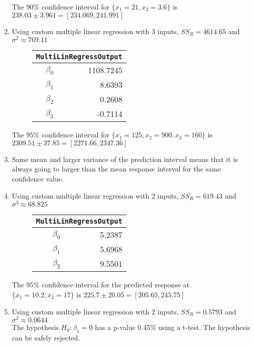 \begin{enumerate}
The $ 90\% $ confidence interval for $ \{x_1 = 21, x_2 = 3.6\} $ is
$ 238.03 \pm 3.961 = [234.069, 241.991]$

\item Using custom multiple linear regression with 3 inputs,
$ SS_R = 4614.65 $ and $ \sigma^2 \approx 769.11 $

\begin{figure}[H]
	\centering
	\begin{tabular}{@{}rr@{}}
		\toprule
		\multicolumn{2}{c}{\texttt{MultiLinRegressOutput}} \\
		\midrule
		$\beta_0$ &        1108.7245 \\
		$\beta_1$ &           8.6393 \\
		$\beta_2$ &           0.2608 \\
		$\beta_3$ &          -0.7114 \\
		\bottomrule
	\end{tabular}
	
\end{figure}

The $ 95\% $ confidence interval for $ \{x_1 = 125, x_2 = 900, x_3 = 160\} $ is
$ 2309.51 \pm 37.85 = [2271.66, 2347.36]$

\item Same mean and larger variance of the prediction interval means that it is always going to larger than the mean response interval for the same confidence value.

\item Using custom multiple linear regression with 2 inputs,
$ SS_R = 619.43 $ and $ \sigma^2 \approx 68.825 $
\begin{figure}[H]
	\centering
	\begin{tabular}{@{}rr@{}}
		\toprule
		\multicolumn{2}{c}{\texttt{MultiLinRegressOutput}} \\
		\midrule
		$\beta_0$ &           5.2387 \\
		$\beta_1$ &           5.6968 \\
		$\beta_2$ &           9.5501 \\
		\bottomrule
	\end{tabular}
\end{figure}

The $ 95\% $ confidence interval for the predicted response at $ \{x_1 = 10.2, x_2 = 17\} $ is
$ 225.7 \pm 20.05 = [205.65, 245.75]$


\item Using custom multiple linear regression with 2 inputs,
$ SS_R = 0.5793 $ and $ \sigma^2 \approx 0.0644 $ \\
The hypothesis $ H_0 : \beta_1 = 0$ has a p-value 0.45\% using a t-test. The hypothesis can be safely rejected.




\end{enumerate}
